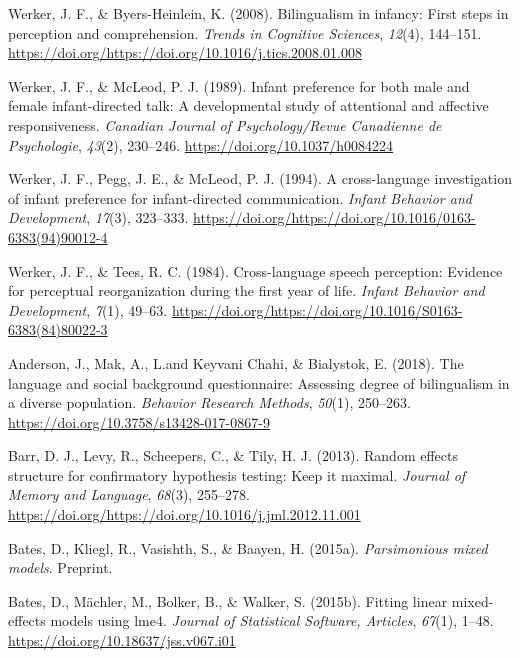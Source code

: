 \documentclass[,man,floatsintext]{apa6}
\begin{document}
\leavevmode\hypertarget{ref-werker_2008}{}%
Werker, J. F., \& Byers-Heinlein, K. (2008). Bilingualism in infancy: First steps in perception and comprehension. \emph{Trends in Cognitive Sciences}, \emph{12}(4), 144--151. \url{https://doi.org/https://doi.org/10.1016/j.tics.2008.01.008}

\leavevmode\hypertarget{ref-werker_1989}{}%
Werker, J. F., \& McLeod, P. J. (1989). Infant preference for both male and female infant-directed talk: A developmental study of attentional and affective responsiveness. \emph{Canadian Journal of Psychology/Revue Canadienne de Psychologie}, \emph{43}(2), 230--246. \url{https://doi.org/10.1037/h0084224}

\leavevmode\hypertarget{ref-werker_1994}{}%
Werker, J. F., Pegg, J. E., \& McLeod, P. J. (1994). A cross-language investigation of infant preference for infant-directed communication. \emph{Infant Behavior and Development}, \emph{17}(3), 323--333. \url{https://doi.org/https://doi.org/10.1016/0163-6383(94)90012-4}

\leavevmode\hypertarget{ref-werker_1984}{}%
Werker, J. F., \& Tees, R. C. (1984). Cross-language speech perception: Evidence for perceptual reorganization during the first year of life. \emph{Infant Behavior and Development}, \emph{7}(1), 49--63. \url{https://doi.org/https://doi.org/10.1016/S0163-6383(84)80022-3}

\leavevmode\hypertarget{ref-anderson_2018}{}%
Anderson, J., Mak, A., L.and Keyvani Chahi, \& Bialystok, E. (2018). The language and social background questionnaire: Assessing degree of bilingualism in a diverse population. \emph{Behavior Research Methods}, \emph{50}(1), 250--263. \url{https://doi.org/10.3758/s13428-017-0867-9}

\leavevmode\hypertarget{ref-barr_2013}{}%
Barr, D. J., Levy, R., Scheepers, C., \& Tily, H. J. (2013). Random effects structure for confirmatory hypothesis testing: Keep it maximal. \emph{Journal of Memory and Language}, \emph{68}(3), 255--278. \url{https://doi.org/https://doi.org/10.1016/j.jml.2012.11.001}

\leavevmode\hypertarget{ref-bates_2015a}{}%
Bates, D., Kliegl, R., Vasishth, S., \& Baayen, H. (2015a). \emph{Parsimonious mixed models}. Preprint.

\leavevmode\hypertarget{ref-bates_2015b}{}%
Bates, D., Mächler, M., Bolker, B., \& Walker, S. (2015b). Fitting linear mixed-effects models using lme4. \emph{Journal of Statistical Software, Articles}, \emph{67}(1), 1--48. \url{https://doi.org/10.18637/jss.v067.i01}
\end{document}
